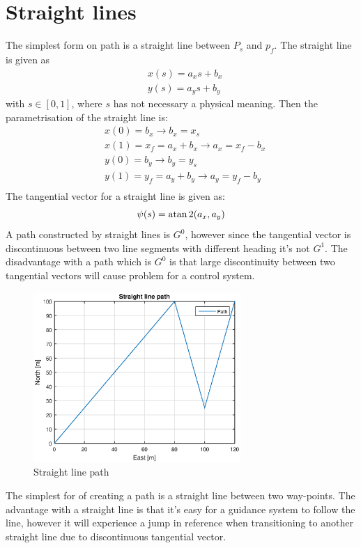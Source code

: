 \section{Straight lines}
The simplest form on path is a straight line between $P_s$ and $p_f$. The straight line is given as 
\begin{subequations}
\begin{align}
& x(s) = a_xs + b_x \\
& y(s) = a_ys + b_y 
\end{align}
\end{subequations}
with $ s \in [0,1] $, where $s$ has not necessary a physical meaning. Then the parametrisation of the straight line is:
\begin{subequations}
\begin{align}
& x(0) = b_x \rightarrow b_x = x_s \\
& x(1) = x_f = a_x + b_x \rightarrow a_x = x_f - b_x \\
& y(0) = b_y \rightarrow b_y = y_s \\
& y(1) = y_f = a_y + b_y \rightarrow a_y = y_f - b_y \\
\end{align}
\end{subequations}
The tangential vector for a straight line is given as:
\begin{equation}
\psi (s) = \operatorname{atan}2(a_x,a_y)
\end{equation}
A path constructed by straight lines is $G^0$, however since the tangential vector is discontinuous between two line segments with different heading it's not $G^1$. The disadvantage with a path which is $G^0$ is that large discontinuity between two tangential vectors will cause problem for a control system. 
\begin{figure}[H]
\includegraphics[width=0.7\textwidth]{figs/TheoryPlot/StraightLine.eps}
\caption{Straight line path}
\end{figure}
The simplest for of creating a path is a straight line between two way-points. The advantage with a straight line is that it's easy for a guidance system to follow the line, however it will experience a jump in reference when transitioning to another straight line due to discontinuous tangential vector.
